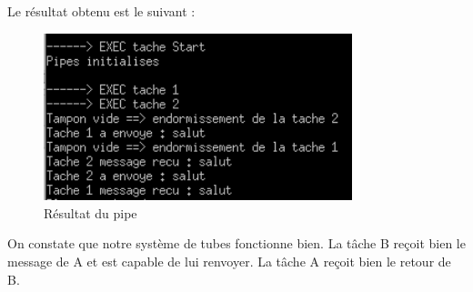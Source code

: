 \documentclass[a4paper,12pt]{report}
\begin{document}
Le résultat obtenu est le suivant :
\begin{figure}[h]
	\centering
		\includegraphics[width=0.8\textwidth]{screens/pipe.PNG}
		\caption{Résultat du pipe}
		\label{pipe}
\end{figure}

On constate que notre système de tubes fonctionne bien. La tâche B reçoit bien le message de A et est capable de lui renvoyer. La tâche A reçoit bien le retour de B.
\end{document}
